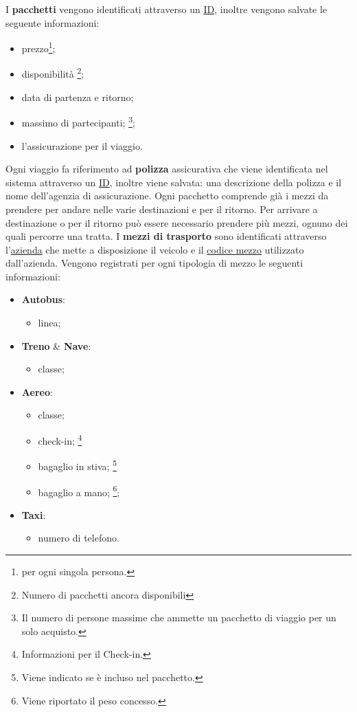 \noindent
%
%
I \textbf{pacchetti} vengono identificati attraverso un \underline{ID}, inoltre vengono salvate le seguente informazioni:
\begin{multicols}{3}
\begin{itemize}
    \item prezzo\footnote{per ogni singola persona.};
    \item disponibilità \footnote{Numero di pacchetti ancora disponibili};
    \item data di partenza e ritorno;
    \item massimo di partecipanti;%
    \footnote{Il numero di persone massime che ammette un pacchetto di viaggio per un solo acquisto.};
    \item l'assicurazione per il viaggio.
  \end{itemize}
\end{multicols}
\noindent
Ogni viaggio fa riferimento ad \textbf{polizza} assicurativa che viene identificata nel sistema attraverso un \underline{ID}, inoltre viene salvata: una descrizione della polizza e il nome dell'agenzia di assicurazione.
%
%
Ogni pacchetto comprende già i mezzi da prendere per andare nelle varie destinazioni e per il ritorno. Per arrivare a destinazione o per il ritorno può essere necessario prendere più mezzi, ognuno dei quali percorre una tratta. I \textbf{mezzi di trasporto} sono identificati attraverso l'\underline{azienda} che mette a disposizione il veicolo e il \underline{codice mezzo} utilizzato dall'azienda. Vengono registrati per ogni tipologia di mezzo le seguenti informazioni:
\begin{multicols}{2}
\begin{itemize}
    \item \textbf{Autobus}:
    \begin{itemize}
        \item linea;
    \end{itemize}
    \item \textbf{Treno} \& \textbf{Nave}:
    \begin{itemize}
        \item classe;
    \end{itemize}
    
    \columnbreak
    
     \item \textbf{Aereo}:
     \begin{itemize}
        \item classe;
        \item check-in; \footnote{Informazioni per il Check-in.}
        \item bagaglio in stiva; \footnote{Viene indicato se è incluso nel pacchetto.}
        \item bagaglio a mano; \footnote{Viene riportato il peso concesso.};
     \end{itemize}
     \item \textbf{Taxi}:
     \begin{itemize}
        \item numero di telefono.
     \end{itemize}
  \end{itemize}
\end{multicols}

